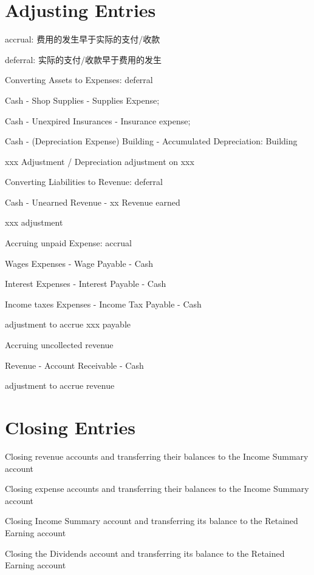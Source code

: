\documentclass[10pt, a4paper]{article}
\begin{document}
\section*{Adjusting Entries}

accrual: 费用的发生早于实际的支付/收款

deferral: 实际的支付/收款早于费用的发生

\medskip

Converting Assets to Expenses: deferral

\quad Cash - Shop Supplies - Supplies Expense;  

\quad Cash - Unexpired Insurances - Insurance expense; 

\quad Cash - (Depreciation Expense) Building - Accumulated Depreciation: Building

\quad xxx Adjustment / Depreciation adjustment on xxx

\medskip

Converting Liabilities to Revenue: deferral 

\quad Cash - Unearned Revenue - xx Revenue earned 

\quad xxx adjustment 

\medskip 

Accruing unpaid Expense: accrual 

\quad Wages Expenses - Wage Payable - Cash

\quad Interest Expenses - Interest Payable - Cash 

\quad Income taxes Expenses - Income Tax Payable - Cash 

\quad adjustment to accrue xxx payable 

\medskip 

Accruing uncollected revenue 

\quad Revenue - Account Receivable - Cash 

\quad adjustment to accrue revenue                                

\section*{Closing Entries}

Closing revenue accounts and transferring their balances to the Income Summary account 

Closing expense accounts and transferring their balances to the Income Summary account

Closing Income Summary account and transferring its balance to the Retained Earning account 

Closing the Dividends account and transferring its balance to the Retained Earning account
\end{document}
